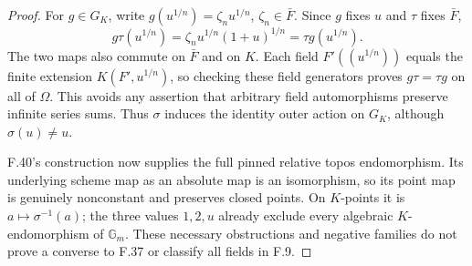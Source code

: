 \begin{proof}
For $g\in G_K$, write $g(u^{1/n})=\zeta_n u^{1/n}$,
$\zeta_n\in\bar F$. Since $g$ fixes $u$ and $\tau$ fixes
$\bar F$,
\[
 g\tau(u^{1/n})
   =\zeta_nu^{1/n}(1+u)^{1/n}
   =\tau g(u^{1/n}).
\]
The two maps also commute on $\bar F$ and on $K$.
Each field $F'((u^{1/n}))$ equals the finite extension
$K(F',u^{1/n})$, so checking these field generators proves
$g\tau=\tau g$ on all of $\Omega$. This avoids any assertion
that arbitrary field automorphisms preserve infinite series
sums. Thus $\sigma$ induces the identity outer action on
$G_K$, although $\sigma(u)\ne u$.

F.40's construction now supplies the full pinned relative
topos endomorphism. Its underlying scheme map as an absolute
map is an isomorphism, so its point map is genuinely nonconstant
and preserves closed points. On $K$-points it is
$a\mapsto\sigma^{-1}(a)$; the three values $1,2,u$ already
exclude every algebraic $K$-endomorphism of $\mathbb G_m$.
These necessary obstructions and negative families do not
prove a converse to F.37 or classify all fields in F.9.
\end{proof}
